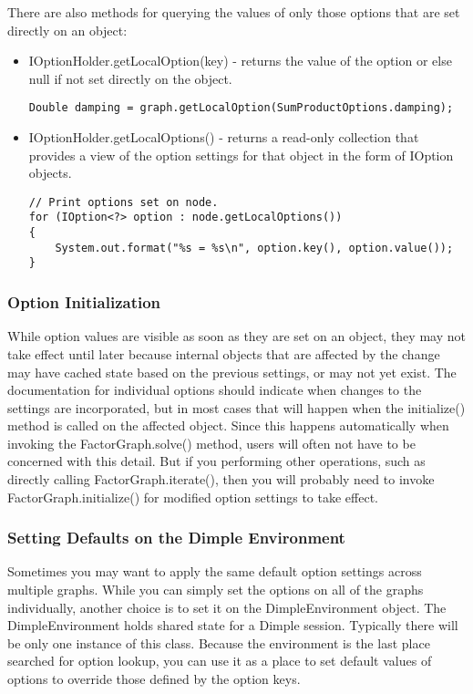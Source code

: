 There are also methods for querying the values of only those options that are set directly on an object:

\begin{itemize}
\item IOptionHolder.getLocalOption(key) - returns the value of the option or else null if not set directly on the object.
\begin{lstlisting}
Double damping = graph.getLocalOption(SumProductOptions.damping);
\end{lstlisting}

\item IOptionHolder.getLocalOptions() - returns a read-only collection that provides a view of the option settings for that object in the form of IOption objects.
\begin{lstlisting}
// Print options set on node.
for (IOption<?> option : node.getLocalOptions())
{
    System.out.format("%s = %s\n", option.key(), option.value());
}
\end{lstlisting}
\end{itemize}

\fi %

\subsubsection{Option Initialization}

While option values are visible as soon as they are set on an object, they may not take effect until later because internal objects that are affected by the change may have cached state based on the previous settings, or may not yet exist. The documentation for individual options should indicate when changes to the settings are incorporated, but in most cases that will happen when the initialize() method is called on the affected object. Since this happens automatically when invoking the FactorGraph.solve() method, users will often not have to be concerned with this detail. But if you performing other operations, such as directly calling FactorGraph.iterate(), then you will probably need to invoke FactorGraph.initialize() for modified option settings to take effect.

\subsubsection{Setting Defaults on the Dimple Environment}

Sometimes you may want to apply the same default option settings across multiple graphs. While you can simply set the options on all of the graphs individually, another choice is to set it on the DimpleEnvironment object. The DimpleEnvironment holds shared state for a Dimple session. Typically there will be only one instance of this class. Because the environment is the last place searched for option lookup, you can use it as a place to set default values of options to override those defined by the option keys.

